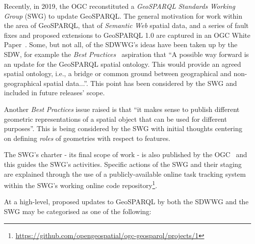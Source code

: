 \documentclass[runningheads]{llncs}
\begin{document}
Recently, in 2019, the OGC reconstituted a \textit{GeoSPARQL Standards Working Group} (SWG) to update GeoSPARQL. The general 
motivation for work within the area of GeoSPARQL, that of \textit{Semantic Web} spatial data, and a series of
fault fixes and proposed extensions to GeoSPARQL 1.0 are captured in an OGC White Paper~\cite{geosparqlwhitepaper}. Some,
but not all, of the SDWWG's ideas have been taken up by the SDW, for example the \textit{Best Practices}~\cite{van_den_brink_best_2018}
aspiration that ``A possible way forward is an update for the GeoSPARQL spatial ontology. This would provide an 
agreed spatial ontology, i.e., a bridge or common ground between geographical and non-geographical spatial data...''.
This point has been considered by the SWG and included in future releases' scope. 

Another \textit{Best Practices} issue raised is that ``it makes sense to publish different geometric representations 
of a spatial object that can be used for different purposes''. This is being considered by the SWG with initial
thoughts centering on defining \textit{roles} of geometries with respect to features.

The SWG's charter - its final scope of work - is also published by the OGC~\cite{abhayaratna2020ogc} and this guides 
the SWG's activities. Specific actions of the SWG and their staging are explained through the use of a publicly-available 
online task tracking system within the SWG's working online code repository\footnote{\url{https://github.com/opengeospatial/ogc-geosparql/projects/1}}.

At a high-level, proposed updates to GeoSPARQL by both the SDWWG and the SWG may be categorised as one of the following:
\end{document}
